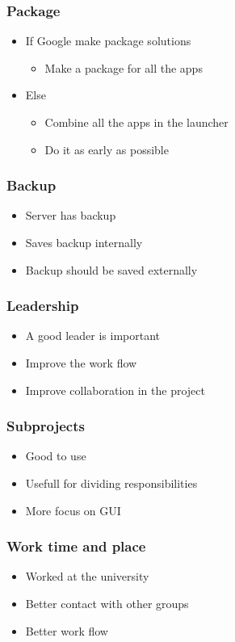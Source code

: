 \begin{frame}
	\frametitle{Package}
	\begin{itemize}
		\item If Google make package solutions
			\begin{itemize}
				\item Make a package for all the apps
			\end{itemize}
		\item Else
			\begin{itemize}
				\item Combine all the apps in the launcher
				\item Do it as early as possible
			\end{itemize}
	\end{itemize}
\end{frame}

\begin{frame}
	\frametitle{Backup}
	\begin{itemize}
		\item Server has backup
		\item Saves backup internally
		\item Backup should be saved externally
	\end{itemize}
\end{frame}

\begin{frame}
	\frametitle{Leadership}
	\begin{itemize}
		\item A good leader is important
		\item Improve the work flow
		\item Improve collaboration in the project
	\end{itemize}
\end{frame}

\begin{frame}
	\frametitle{Subprojects}
	\begin{itemize}
		\item Good to use
		\item Usefull for dividing responsibilities
		\item More focus on GUI
	\end{itemize}
\end{frame}

\begin{frame}
	\frametitle{Work time and place}
	\begin{itemize}
		\item Worked at the university
		\item Better contact with other groups
		\item Better work flow
	\end{itemize}
\end{frame}

